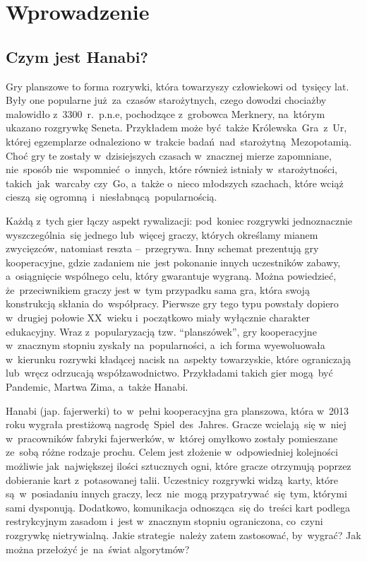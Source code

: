 \documentclass[declaration,shortabstract,inz]{iithesis}
\author{Wojciech Jarząbek\and Jacek Leja}
\date{\today}
\begin{document}
\chapter{Wprowadzenie}

\section{Czym jest Hanabi?}

Gry planszowe to forma rozrywki, która towarzyszy człowiekowi od~tysięcy lat. Były one popularne już za~czasów starożytnych, czego dowodzi chociażby malowidło z~3300~r.~p.n.e, pochodzące z~grobowca Merknery, na~którym ukazano rozgrywkę Seneta. Przykładem może być także Królewska~Gra~z~Ur, której egzemplarze odnaleziono w~trakcie badań nad~starożytną Mezopotamią. Choć gry te zostały w~dzisiejszych czasach w~znacznej mierze zapomniane, nie~sposób nie~wspomnieć o~innych, które również istniały w~starożytności, takich~jak~warcaby czy~Go, a~także o~nieco młodszych szachach, które wciąż cieszą~się ogromną i~niesłabnącą popularnością.

Każdą z~tych gier łączy aspekt rywalizacji: pod~koniec rozgrywki jednoznacznie wyszczególnia~się jednego lub~więcej graczy, których określamy mianem zwycięzców, natomiast reszta --~przegrywa. Inny schemat prezentują gry kooperacyjne, gdzie zadaniem nie~jest pokonanie innych uczestników zabawy, a~osiągnięcie wspólnego celu, który gwarantuje wygraną. Można powiedzieć, że~przeciwnikiem graczy jest w~tym przypadku sama gra, która swoją konstrukcją skłania do~współpracy. Pierwsze gry tego typu powstały dopiero w~drugiej połowie XX~wieku i~początkowo miały wyłącznie charakter edukacyjny. Wraz z~popularyzacją tzw. ``planszówek'', gry kooperacyjne w~znacznym stopniu zyskały na~popularności, a~ich forma wyewoluowała w~kierunku rozrywki kładącej nacisk na~aspekty towarzyskie, które ograniczają lub~wręcz odrzucają współzawodnictwo. Przykładami takich gier mogą~być Pandemic, Martwa Zima, a~także Hanabi.

Hanabi (jap. fajerwerki) to~w~pełni kooperacyjna gra planszowa, która w~2013 roku wygrała prestiżową nagrodę Spiel~des~Jahres. Gracze wcielają~się w~niej w~pracowników fabryki fajerwerków, w~której omyłkowo zostały pomieszane ze~sobą różne rodzaje prochu. Celem jest złożenie w~odpowiedniej kolejności możliwie jak~największej ilości sztucznych ogni, które gracze otrzymują poprzez dobieranie kart z~potasowanej talii. Uczestnicy rozgrywki widzą karty, które są~w~posiadaniu innych graczy, lecz~nie~mogą przypatrywać~się~tym, którymi sami dysponują. Dodatkowo, komunikacja odnosząca~się do~treści kart podlega restrykcyjnym zasadom i~jest w~znacznym stopniu ograniczona, co~czyni rozgrywkę nietrywialną. Jakie strategie należy zatem zastosować, by~wygrać? Jak można przełożyć je~na~świat algorytmów?
\end{document}
